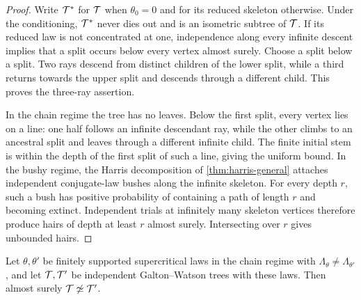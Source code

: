 \begin{proof}
\leanok
{}
Write $\mathcal{T}^*$ for $\mathcal{T}$ when $\theta_0=0$ and for its reduced skeleton otherwise. Under the
conditioning, $\mathcal{T}^*$ never dies out and is an isometric subtree of $\mathcal{T}$. If its reduced law is
not concentrated at one, independence along every infinite descent implies that a split occurs
below every vertex almost surely. Choose a split below a split. Two rays descend from distinct
children of the lower split, while a third returns towards the upper split and descends through a
different child. This proves the three-ray assertion.

In the chain regime the tree has no leaves. Below the first split, every vertex lies on a line:
one half follows an infinite descendant ray, while the other climbs to an ancestral split and
leaves through a different infinite child. The finite initial stem is within the depth of the
first split of such a line, giving the uniform bound. In the bushy regime, the Harris decomposition
of \cref{thm:harris-general} attaches independent conjugate-law bushes along the infinite
skeleton. For every depth $r$, such a bush has positive probability of containing a path of
length $r$ and becoming extinct. Independent trials at infinitely many skeleton vertices
therefore produce hairs of depth at least $r$ almost surely. Intersecting over $r$ gives
unbounded hairs.
\end{proof}

\begin{proposition}
\label{thm:chain-separation}
\leanok
{}
Let $\theta,\theta'$ be finitely supported supercritical laws in the chain regime with
$\Lambda_{\theta}\neq\Lambda_{\theta'}$, and let $\mathcal{T},\mathcal{T}'$ be independent Galton--Watson trees
with these laws. Then almost surely $\mathcal{T}\not\simeq\mathcal{T}'$.
\end{proposition}

